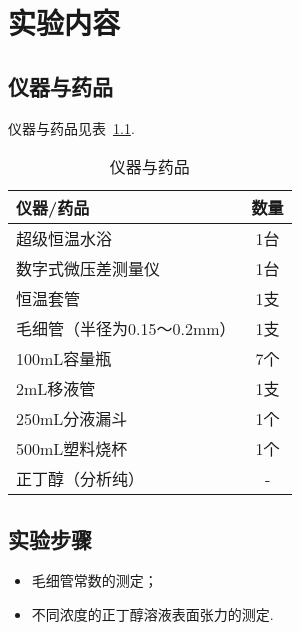 

\chapter{实验内容}

\section{仪器与药品}
仪器与药品见表~\ref{tab1}.
\begin{table}[h]
  \centering
  \caption{仪器与药品}
  \label{tab1}
  \begin{tabular}{lc}
    \toprule
    仪器/药品   & 数量  \\
    \midrule
    超级恒温水浴           &   1台     \\
    数字式微压差测量仪      &    1台\\
    恒温套管               &   1支     \\
    毛细管（半径为0.15～0.2mm）& 1支\\
    100mL容量瓶            &  7个     \\
    2mL移液管              &    1支\\
    250mL分液漏斗          &  1个     \\
    500mL塑料烧杯          &    1个 \\
    正丁醇（分析纯）& - \\
    \bottomrule
  \end{tabular}
\end{table}

\section{实验步骤}
\begin{itemize}
  \item 毛细管常数的测定；
  \item 不同浓度的正丁醇溶液表面张力的测定.
\end{itemize}
